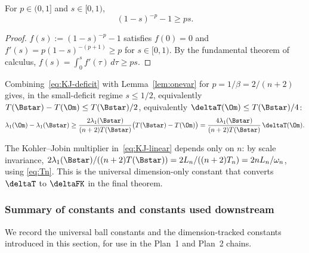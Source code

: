 \begin{lemma}\label{lem:onevar}
For $p\in(0,1]$ and $s\in[0,1)$,
\begin{equation}\label{eq:onevar}
   (1-s)^{-p}-1\ge ps.
\end{equation}
\end{lemma}

\begin{proof}
$f(s):=(1-s)^{-p}-1$ satisfies $f(0)=0$ and
$f'(s)=p(1-s)^{-(p+1)}\ge p$ for $s\in[0,1)$. By the fundamental
theorem of calculus, $f(s)=\int_0^s f'(\tau)\,d\tau\ge ps$.
\end{proof}

Combining~\eqref{eq:KJ-deficit} with Lemma~\ref{lem:onevar} for
$p=1/\beta=2/(n+2)$ gives, in the small-deficit regime
$s\le 1/2$, equivalently $T(\Bstar)-T(\Om)\le T(\Bstar)/2$,
equivalently $\deltaT(\Om)\le T(\Bstar)/4$:
\begin{equation}\label{eq:KJ-linear}
   \lambda_1(\Om)-\lambda_1(\Bstar)
   \ge\frac{2\lambda_1(\Bstar)}{(n+2)T(\Bstar)}
       \bigl(T(\Bstar)-T(\Om)\bigr)
   =\frac{4\lambda_1(\Bstar)}{(n+2)T(\Bstar)}\,\deltaT(\Om).
\end{equation}

\begin{remark}\label{rem:KJ-dim}
The Kohler--Jobin multiplier in~\eqref{eq:KJ-linear} depends only on
$n$: by scale invariance,
$2\lambda_1(\Bstar)/((n+2)T(\Bstar))=2L_n/((n+2)T_n)=2nL_n/\omega_n$,
using \eqref{eq:Tn}. This is the universal dimension-only constant
that converts $\deltaT$ to $\deltaFK$ in the final theorem.
\end{remark}

\subsubsection{Summary of constants and constants used downstream}
\label{ssec:prelim-summary}

We record the universal ball constants and the dimension-tracked
constants introduced in this section, for use in the Plan~1 and
Plan~2 chains.


